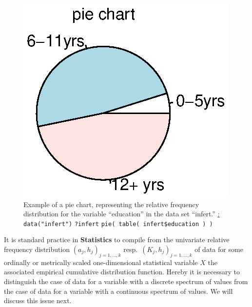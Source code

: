 %
\begin{figure}[!htb]
\begin{flushleft}
\includegraphics[scale=0.8]{piechart.eps}
\end{flushleft}
\caption{Example of a pie chart, representing the relative
frequency distribution for the variable ``education'' in the
\R{} data set ``infert.'' \newline
\underline{\R:} \newline
\texttt{data("infert")} \newline
\texttt{?infert} \newline
\texttt{pie( table( infert\$education ) )}}
\end{figure}
%

\medskip
\noindent
It is standard practice in \textbf{Statistics} to compile from the 
univariate relative frequency distribution 
$(a_{j},h_{j})_{j=1,\ldots,k}$
resp.\ $(K_{j},h_{j})_{j=1,\ldots,k}$ of data for some ordinally 
or metrically scaled one-dimensional statistical variable $X$ the 
associated empirical cumulative distribution function. Hereby it 
is necessary to distinguish the case of data for a variable with a 
discrete spectrum of values from the case of data for a variable 
with a continuous spectrum of values. We will discuss this issue 
next.

